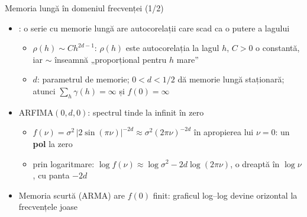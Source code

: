 \begin{frame}{Memoria lungă în domeniul frecvenței (1/2)}
\itemsize{\footnotesize}
\begin{itemize}
    \item {}: o serie cu memorie lungă are autocorelații care scad ca o putere a lagului
    \begin{itemize}
        \item $\rho(h) \sim Ch^{2d-1}$: $\rho(h)$ este autocorelația la lagul $h$, $C > 0$ o constantă, iar $\sim$ înseamnă „proporțional pentru $h$ mare”
        \item $d$: parametrul de memorie; $0 < d < 1/2$ dă memorie lungă staționară; atunci $\sum_h\gamma(h) = \infty$ și $f(0) = \infty$
    \end{itemize}
    \item ARFIMA$(0,d,0)$: spectrul tinde la infinit în zero
    \begin{itemize}
        \item $f(\nu) = \sigma^2\,|2\sin(\pi\nu)|^{-2d} \approx \sigma^2(2\pi\nu)^{-2d}$ în apropierea lui $\nu = 0$: un \textbf{pol} la zero
        \item prin logaritmare: $\log f(\nu) \approx \log\sigma^2 - 2d\log(2\pi\nu)$, o dreaptă în $\log\nu$, cu panta $-2d$
    \end{itemize}
    \item Memoria scurtă (ARMA) are $f(0)$ finit: graficul log--log devine orizontal la frecvențele joase
\end{itemize}
\end{frame}


